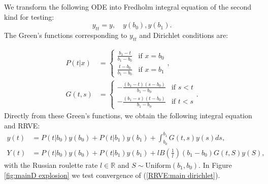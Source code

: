 \documentclass[a4paper,12pt]{article}
\begin{document}
\begin{example}[Dirichlet $y_{tt}=y$] \label{main dirichlet}
    We transform the following ODE into Fredholm integral equation of
    the second kind for testing:
    \begin{equation} \label{eq:main dirichlet}
        y_{tt}=y, \quad y(b_{0}),y(b_{1}).
    \end{equation}
    The Green's functions corresponding to $y_{tt}$ and Dirichlet conditions are:

    \begin{align}
        P(t|x) & = \begin{cases}
                       \frac{b_{1}-t}{b_{1}-b_{0}} & \text{if } x = b_{0} \\
                       \frac{t-b_{0}}{b_{1}-b_{0}} & \text{if } x = b_{1}
                   \end{cases},       \\
        G(t,s) & = \begin{cases}
                       -\frac{(b_{1}-t)(s-b_{0})}{b_{1}-b_{0}} & \text{if } s<t \\
                       -\frac{(b_{1}-s)(t-b_{0})}{b_{1}-b_{0}} & \text{if } t<s
                   \end{cases}.
    \end{align}
    Directly from these Green's functions, we obtain the following integral equation and RRVE:
    \begin{align} \label{inteq:main dirichlet}
        y(t) & = P(t|b_{0}) y(b_{0}) + P(t|b_{1}) y(b_{1}) +
        \int_{b_{0}}^{b_{1}} G(t,s)y(s) ds,                  \\
        Y(t) & = P(t|b_{0}) y(b_{0}) + P(t|b_{1}) y(b_{1})
        + l B\left(\frac{1}{l} \right)(b_{1}-b_{0}) G(t,S)y(S) , \label{RRVE:main dirichlet}
    \end{align}
    with the Russian roulette rate $l \in \mathbb{R}$  and
    $S \sim \text{Uniform}(b_{1},b_{0})$. In Figure \ref{fig:mainD explosion}
    we test convergence of (\ref{RRVE:main dirichlet}).
\end{example}
\end{document}
